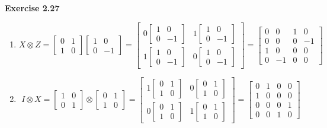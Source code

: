 \documentclass{article}
\begin{document}
\begin{framed}
    \noindent \textbf{Exercise 2.27}
    
    \medskip
    \begin{enumerate}
        \item 
        $$
        X \otimes Z = \begin{bmatrix}0 & 1\\ 1 & 0\end{bmatrix}\begin{bmatrix}1 & 0\\ 0 & -1\end{bmatrix} = 
        \begin{bmatrix}0\begin{bmatrix}1 & 0\\ 0 & -1\end{bmatrix} & 1\begin{bmatrix}1 & 0\\ 0 & -1\end{bmatrix}\\ 1\begin{bmatrix}1 & 0\\ 0 & -1\end{bmatrix} & 0\begin{bmatrix}1 & 0\\ 0 & -1\end{bmatrix}\end{bmatrix} = \begin{bmatrix} 0 & 0 & 1 & 0\\ 0 & 0& 0 & -1\\ 1 & 0 & 0 & 0\\ 0 & -1 & 0 & 0\end{bmatrix}
        $$
        \item 
        $$
        I \otimes X = \begin{bmatrix}1 & 0 \\ 0 & 1\end{bmatrix} \otimes \begin{bmatrix}0 & 1 \\ 1 & 0\end{bmatrix} = \begin{bmatrix}1\begin{bmatrix}0 & 1 \\ 1 & 0\end{bmatrix} & 0\begin{bmatrix}0 & 1 \\ 1 & 0\end{bmatrix} \\ 0\begin{bmatrix}0 & 1 \\ 1 & 0\end{bmatrix} & 1\begin{bmatrix}0 & 1 \\ 1 & 0\end{bmatrix}\end{bmatrix} = \begin{bmatrix} 0 & 1 & 0 & 0\\ 1 & 0 & 0 & 0\\ 0 & 0 & 0 & 1\\ 0 & 0 & 1 & 0\end{bmatrix}
$$
\end{enumerate}
\end{framed}
\end{document}
